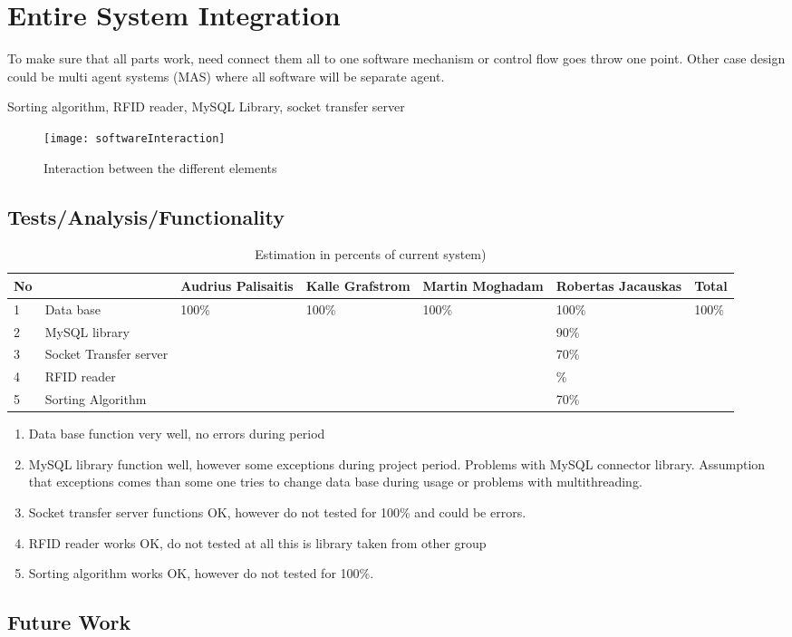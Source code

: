 %
\section{Entire System Integration}

To make sure that all parts work, need connect them all to one software mechanism or control flow goes throw one point. Other case design could be multi agent systems (MAS) where all software will be separate agent.

Sorting algorithm, RFID reader, MySQL Library, socket transfer server

\begin{figure}[h]
	\centering
		\texttt{[image: softwareInteraction]}
	\caption{Interaction between the different elements}
	\label{fig:planning}
\end{figure}


\subsection{Tests/Analysis/Functionality}

\begin{table}[h]
	
    \begin{tabular}{ | p{0.5cm} | p{3.5cm} | p{1.6cm} | p{1.6cm} |p{1.6cm} |p{1.6cm} |p{1cm} |}
    \hline
	No &  & Audrius Palisaitis & Kalle Grafstrom & Martin Moghadam & Robertas Jacauskas & Total\\ \hline
	1 & Data base & 100\% & 100\% & 100\% & 100\% & 100\% \\ \hline
	2 & MySQL library &  &  &  & 90\% &  \\ \hline
	3 & Socket Transfer server &  &  &  & 70\% &  \\ \hline
	4 & RFID reader &  &  &  & \% &  \\ \hline
	5 & Sorting Algorithm &  &  &  & 70\% &  \\ \hline
    \end{tabular}
	\caption{Estimation in percents of current system)}
	\label{tab:AdDis}
\end{table}

\begin{enumerate}
	\item Data base function very well, no errors during period
	\item MySQL library function well, however some exceptions during project period. Problems with MySQL connector library. Assumption that exceptions comes than some one tries to change data base during usage or problems with multithreading.
	\item Socket transfer server functions OK, however do not tested for 100\% and could be errors.
	\item RFID reader works OK, do not tested at all this is library taken from other group
	\item Sorting algorithm works OK, however do not tested for 100\%.
\end{enumerate}

\subsection{Future Work}

